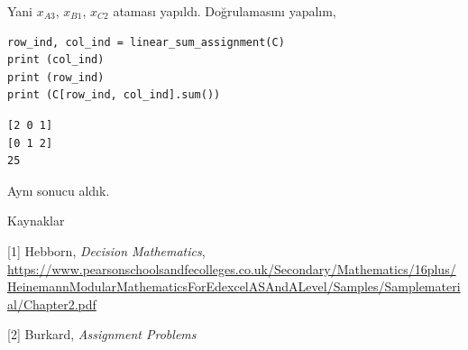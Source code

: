 \documentclass[12pt,fleqn]{article}\usepackage{../../common}
\begin{document}
Yani $x_{A3}$, $x_{B1}$, $x_{C2}$ ataması yapıldı. Doğrulamasını yapalım,

\begin{verbatim}
row_ind, col_ind = linear_sum_assignment(C)
print (col_ind)
print (row_ind)
print (C[row_ind, col_ind].sum())
\end{verbatim}

\begin{verbatim}
[2 0 1]
[0 1 2]
25
\end{verbatim}

Aynı sonucu aldık. 


Kaynaklar

[1] Hebborn, {\em Decision Mathematics}, 
    \url{https://www.pearsonschoolsandfecolleges.co.uk/Secondary/Mathematics/16plus/HeinemannModularMathematicsForEdexcelASAndALevel/Samples/Samplematerial/Chapter2.pdf}

[2] Burkard, {\em Assignment Problems}
\end{document}
